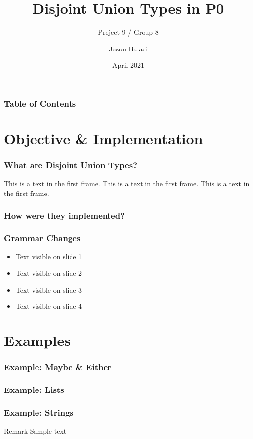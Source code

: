 \documentclass{beamer}
\title[Disjoint Union Types]{Disjoint Union Types in P0}
\subtitle{Project 9 / Group 8}
\author{Jason Balaci}
\institute{McMaster University}
\date{April 2021}
\begin{document}
\frame{\titlepage}

\begin{frame}
\frametitle{Table of Contents}
\tableofcontents
\end{frame}

\section{Objective \& Implementation}

\begin{frame}
\frametitle{What are Disjoint Union Types?}
This is a text in the first frame. This is a text in the first frame. This is a text in the first frame.\\
\end{frame}

\begin{frame}
\frametitle{How were they implemented?}
\end{frame}

\begin{frame}
\frametitle{Grammar Changes}

\begin{itemize}
 \item<1-> Text visible on slide 1
 \item<2-> Text visible on slide 2
 \item<3-> Text visible on slide 3
 \item<4-> Text visible on slide 4
\end{itemize}

\end{frame}

\section{Examples}

\begin{frame}
\frametitle{Example: Maybe \& Either}
\end{frame}

\begin{frame}
\frametitle{Example: Lists}
\end{frame}

\begin{frame}
\frametitle{Example: Strings}

\begin{block}{Remark}
Sample text
\end{block}
\end{frame}
\end{document}
